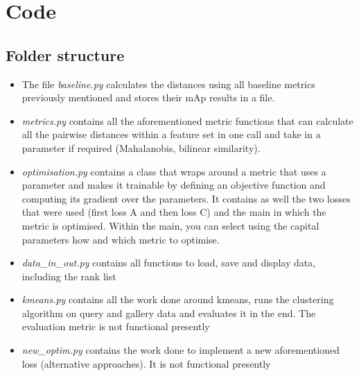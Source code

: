 \documentclass[10pt,technote]{IEEEtran}
\begin{document}
\section{Code}
\subsection{Folder structure}

\begin{itemize}
    \item The file \textit{baseline.py} calculates the distances using all baseline metrics previously mentioned and stores their mAp results in a file.
    \item \textit{metrics.py} contains all the aforementioned metric functions that can calculate all the pairwise distances within a feature set in one call and take in a parameter if required (Mahalanobis, bilinear similarity). 
    \item \textit{optimisation.py} contains a class that wraps around a metric that uses a parameter and makes it trainable by defining an objective function and computing its gradient over the parameters. It contains as well the two losses that were used (first loss A and then loss C) and the main in which the metric is optimised. Within the main, you can select using the capital parameters how and which metric to optimise.

    \item \textit{data\_in\_out.py} contains all functions to load, save and display data, including the rank list
    \item \textit{kmeans.py} contains all the work done around kmeans, runs the clustering algorithm on query and gallery data and evaluates it in the end. The evaluation metric is not functional presently
    \item \textit{new\_optim.py} contains the work done to implement a new aforementioned loss (alternative approaches). It is not functional presently
\end{itemize}
\end{document}
